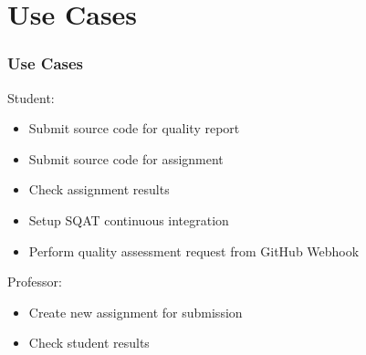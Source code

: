 \section{Use Cases}
\begin{frame}
\frametitle{Use Cases}

Student:
\begin{itemize}
  \item Submit source code for quality report
  \item Submit source code for assignment
  \item Check assignment results
  \item Setup SQAT continuous integration
  \item Perform quality assessment request from GitHub Webhook
\end{itemize}

Professor:
\begin{itemize}
  \item Create new assignment for submission
  \item Check student results
\end{itemize}
\end{frame}
